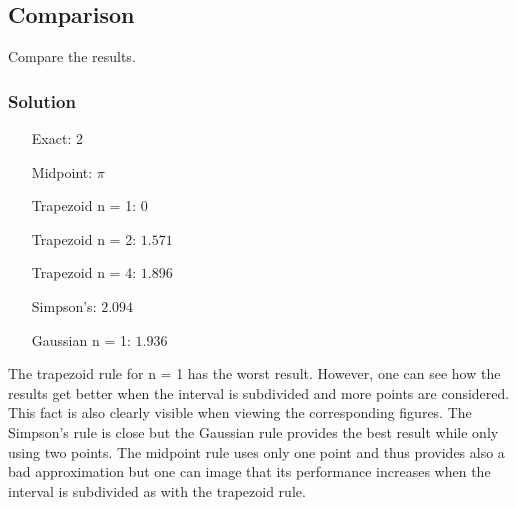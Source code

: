 \newpage

\subsection{Comparison}
Compare the results.

\subsubsection{Solution}
\begin{itemize}
	\item [Exact: ] 2
	\item [Midpoint: ] $\pi$
	\item [Trapezoid n = 1:] 0
	\item [Trapezoid n = 2: ] $1.571$
	\item [Trapezoid n = 4:] $1.896$
	\item [Simpson's: ] $2.094$
	\item [Gaussian n = 1: ] $1.936$
\end{itemize}

The trapezoid rule for n = 1 has the worst result. However, one can see how the results get better when the interval is subdivided and more points are considered. This fact is also clearly visible when viewing the corresponding figures. The Simpson's rule is close but the Gaussian rule provides the best result while only using two points. The midpoint rule uses only one point and thus provides also a bad approximation but one can image that its performance increases when the interval is subdivided as with the trapezoid rule.




